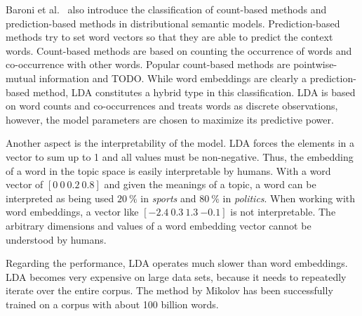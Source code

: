 \documentclass{sig-alternate-05-2015}
\begin{document}
Baroni et al.~\cite{Baroni2014} also introduce the classification of count-based methods and prediction-based methods in distributional semantic models.
Prediction-based methods try to set word vectors so that they are able to predict the context words.
Count-based methods are based on counting the occurrence of words and co-occurrence with other words.
Popular count-based methods are pointwise-mutual information and TODO.
While word embeddings are clearly a prediction-based method, LDA constitutes a hybrid type in this classification.
LDA is based on word counts and co-occurrences and treats words as discrete observations, however, the model parameters are chosen to maximize its predictive power.

Another aspect is the interpretability of the model.
LDA forces the elements in a vector to sum up to 1 and all values must be non-negative.
Thus, the embedding of a word in the topic space is easily interpretable by humans.
With a word vector of $[0~0~0.2~0.8]$ and given the meanings of a topic, a word can be interpreted as being used $20~\%$ in \emph{sports} and $80~\%$ in \emph{politics}.
When working with word embeddings, a vector like $[{-2.4}~0.3~1.3~{-0.1}]$ is not interpretable.
The arbitrary dimensions and values of a word embedding vector cannot be understood by humans.

Regarding the performance, LDA operates much slower than word embeddings.
LDA becomes very expensive on large data sets, because it needs to repeatedly iterate over the entire corpus.
The method by Mikolov has been successfully trained on a corpus with about 100 billion words.

\end{document}
